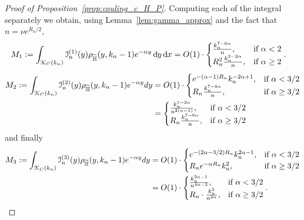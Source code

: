 \begin{proof}[Proof of Proposition~\ref{prop:couling_c_H_P}]
Computing each of the integral separately we obtain, using Lemma~\ref{lem:gamma_approx} and the fact that $n = \nu e^{R_n/2}$,
\begin{align*} 
M_1:= \int_{{\mathcal K}_{C}(k_n)} \mathcal{I}_n^{(1)}(y) \rho_{\widetilde{\mathbb{H}}}(y,k_n-1) e^{-\alpha y} \operatorname{\mathrm{d}\hspace{-2pt}} y \operatorname{\mathrm{d}\hspace{-2pt}} x
&= O(1) \cdot 
\begin{cases} 
	\frac{k_n^{7-6\alpha}}{n}, & \mbox{if $\alpha <2$} \\
	R_n^2 \frac{k_n^{3-2\alpha}}{n}, & \mbox{if $\alpha \geq 2$}
\end{cases}. 
\end{align*}
\begin{align*} 
M_2:= \int_{{\mathcal K}_{C}(k_n)} \mathcal{I}_n^{(2)}(y) \rho_{\widetilde{\mathbb{H}}}(y,k_n-1) e^{-\alpha y} dy
&= O(1) \cdot 
\begin{cases}
e^{-(\alpha - 1)R_n} k_n^{-2\alpha+1}, & \mbox{if $\alpha < 3/2$} \\
R_n   \frac{k_n^{7-6\alpha }}{n}, & \mbox{if $\alpha \geq 3/2$}
\end{cases} 
\\
&=\begin{cases}
\frac{k_n^{1-2\alpha}}{n^{2(\alpha-1)}}, & \mbox{if $\alpha < 3/2$} \\
R_n   \frac{k_n^{7-6\alpha}}{n}, & \mbox{if $\alpha \geq 3/2$}
\end{cases}
\end{align*}
and finally 
\begin{align*} 
M_3:= \int_{{\mathcal K}_{C}(k_n)} \mathcal{I}_n^{(3)}(y) \rho_{\widetilde{\mathbb{H}}}(y,k_n-1) e^{-\alpha y} dy
&= O(1) \cdot 
\begin{cases} 
e^{-(2\alpha - 3/2) R_n} k_n^{2\alpha - 1}, & \mbox{if $\alpha <3/2$} \\ 
R_n  e^{-\alpha R_n} k_n^2, &\mbox{if $\alpha \geq 3/2$}
\end{cases} \\
&=O(1) \cdot 
\begin{cases} 
\frac{k_n^{2\alpha - 1}}{n^{4\alpha -3}}, & \mbox{if $\alpha <3/2$} \\ 
R_n \cdot \frac{k_n^2}{n^{2\alpha}}, &\mbox{if $\alpha \geq 3/2$}
\end{cases}  .
\end{align*}


\end{proof}
